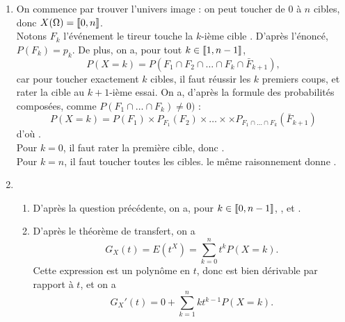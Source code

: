 \documentclass[a4paper, 11pt,reqno]{article}
\begin{document}
\begin{correction}  \;
	\begin{enumerate}
		\item On commence par trouver l'univers image : on peut toucher de $0$ \`a $n$ cibles, donc $X(\Omega) =\llbracket  0,n\rrbracket$.\\
		      Notons $F_k$ l'\'ev\'enement \og le tireur touche la $k$-i\`eme cible \fg. D'apr\`es l'\'enonc\'e, $P(F_k) = p_k$. De plus, on a, pour tout $k \in \llbracket  1,n-1\rrbracket$,
		      $$P(X=k) = P(F_1 \cap F_2 \cap \ldots \cap F_k \cap \bar F_{k+1}),$$
		      car pour toucher exactement $k$ cibles, il faut r\'eussir les $k$ premiers coups, et rater la cible au $k+1$-i\`eme essai. On a, d'apr\`es la formule des probabilit\'es compos\'ees, comme $P(F_1\cap \ldots \cap F_k) \not=0)$ :
		      $$P(X=k) = P(F_1) \times P_{F_1}(F_2) \times \ldots \times \times P_{F_1\cap \ldots \cap F_k}(\bar F_{k+1})$$
		      d'o\`u .\\
		      Pour $k=0$, il faut rater la premi\`ere cible, donc .\\
		      Pour $k=n$, il faut toucher toutes les cibles. le m\^eme raisonnement donne .
		\item %
		      \begin{enumerate}
			      \item  D'apr\`es la question pr\'ec\'edente, on a, pour $k \in \llbracket  0,n-1\rrbracket$, , et . %
			      \item %
			            D'apr\`es le th\'eor\`eme de transfert, on a
			            $$G_X(t) = E(t^X) = \sum\limits_{k=0}^n t^k P(X=k).$$
			            Cette expression est un polyn\^ome en $t$, donc est bien d\'erivable par rapport \`a $t$, et on a
			            $$G_X'(t) = 0 + \sum\limits_{k=1}^n k t^{k-1} P(X=k).$$

\end{enumerate}
\end{enumerate}
\end{correction}
\end{document}
